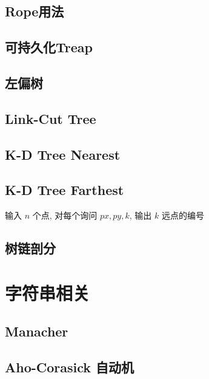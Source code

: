 \documentclass[landscape, twocolumn, 8pt, a4paper, twoside]{extarticle}
\begin{document}
  \subsection{Rope用法}
    
  
  \subsection{可持久化Treap}
    
  
  \subsection{左偏树}
    
  
  \subsection{Link-Cut Tree}
    

  \subsection{K-D Tree Nearest}
    

  \subsection{K-D Tree Farthest}
    输入 $n$ 个点, 对每个询问 $px, py, k$, 输出 $k$ 远点的编号
    

  \subsection{树链剖分}
    

\section{字符串相关}
  \subsection{Manacher}
    

    \subsection{Aho-Corasick 自动机}
    
\end{document}
